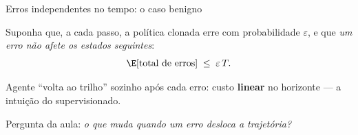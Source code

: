 \documentclass[aspectratio=169, 11pt]{beamer}
\begin{document}
\begin{frame}{Erros independentes no tempo: o caso benigno}

  Suponha que, a cada passo, a política clonada erre com probabilidade
  $\varepsilon$, e que \emph{um erro não afete os estados seguintes}:
  \[
    \E[\text{total de erros}] \;\le\; \varepsilon\,T .
  \]

  \begin{center}
  \end{center}

  \begin{ideiabox}
    Agente ``volta ao trilho'' sozinho após cada erro: custo \textbf{linear}
    no horizonte --- a intuição do supervisionado.
  \end{ideiabox}

  Pergunta da aula: \emph{o que muda quando um erro desloca a trajetória?}
\end{frame}
\end{document}
